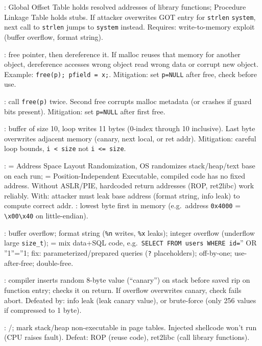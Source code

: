 : Global Offset Table holds resolved addresses of library functions; Procedure Linkage Table holds stubs. If attacker overwrites GOT entry for \texttt{strlen} \to \texttt{system}, next call to \texttt{strlen} jumps to \texttt{system} instead. Requires: write-to-memory exploit (buffer overflow, format string).

: free pointer, then dereference it. If malloc reuses that memory for another object, dereference accesses wrong object \to read wrong data or corrupt new object. Example: \texttt{free(p); p\to field = x;}. Mitigation: set \texttt{p=NULL} after free, check before use.

: call \texttt{free(p)} twice. Second free corrupts malloc metadata (or crashes if guard bits present). Mitigation: set \texttt{p=NULL} after first free.

: buffer of size 10, loop writes 11 bytes (0-index through 10 inclusive). Last byte overwrites adjacent memory (canary, next local, or ret addr). Mitigation: careful loop bounds, \texttt{i < size} not \texttt{i <= size}.

:  = Address Space Layout Randomization, OS randomizes stack/heap/text base on each run;  = Position-Independent Executable, compiled code has no fixed address. Without ASLR/PIE, hardcoded return addresses (ROP, ret2libc) work reliably. With: attacker must leak base address (format string, info leak) to compute correct addr. : lowest byte first in memory (e.g.\ address \texttt{0x4000} = \texttt{\textbackslash x00\textbackslash x40} on little-endian).

: buffer overflow; format string (\texttt{\%n} writes, \texttt{\%x} leaks); integer overflow (underflow \to large \texttt{size\_t});  = mix data+SQL code, e.g.\ \texttt{SELECT \* FROM users WHERE id=}'' OR ''1''=''1; fix: parameterized/prepared queries (\texttt{?} placeholders); off-by-one; use-after-free; double-free.


: compiler inserts random 8-byte value (``canary'') on stack before saved rip on function entry; checks it on return. If overflow overwrites canary, check fails \to abort. Defeated by: info leak (leak canary value), or brute-force (only 256 values if compressed to 1 byte).

: /; mark stack/heap non-executable in page tables. Injected shellcode won't run (CPU raises fault). Defeat: ROP (reuse code), ret2libc (call library functions).

